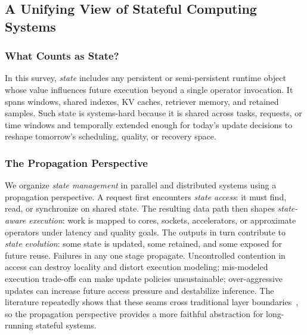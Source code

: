 \documentclass[manuscript]{acmart}
\begin{document}
\subsection{A Unifying View of Stateful Computing Systems}

\subsubsection{What Counts as State?}

In this survey, \emph{state} includes any persistent or semi-persistent runtime object whose value influences future execution beyond a single operator invocation. It spans windows, shared indexes, KV caches, retriever memory, and retained samples. Such state is systems-hard because it is shared across tasks, requests, or time windows and temporally extended enough for today's update decisions to reshape tomorrow's scheduling, quality, or recovery space.

\subsubsection{The Propagation Perspective}

We organize \emph{state management} in parallel and distributed systems using a propagation perspective. A request first encounters \emph{state access}: it must find, read, or synchronize on shared state. The resulting data path then shapes \emph{state-aware execution}: work is mapped to cores, sockets, accelerators, or approximate operators under latency and quality goals. The outputs in turn contribute to \emph{state evolution}: some state is updated, some retained, and some exposed for future reuse. Failures in any one stage propagate. Uncontrolled contention in access can destroy locality and distort execution modeling; mis-modeled execution trade-offs can make update policies unsustainable; over-aggressive updates can increase future access pressure and destabilize inference. The literature repeatedly shows that these seams cross traditional layer boundaries~\cite{zhang2019briskstream,zhang2020concurrent,zeng2024pecj,zhou2025ferret,li2026streamfp,zhang2026flowrag}, so the propagation perspective provides a more faithful abstraction for long-running stateful systems.
\end{document}
